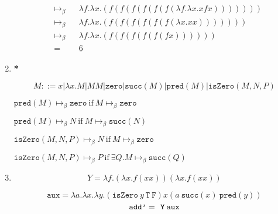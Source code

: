 \documentclass[11pt]{article}
\begin{document}
\begin{enumerate}
\begin{enumerate}
\begin{align*}
			            \mapsto_\beta                                  &  & \lambda f. \lambda x. (f(f(f(f(f(f( \lambda f. \lambda x. x f x)))))))                                                           & \\
			            \mapsto_\beta                                  &  & \lambda f. \lambda x. (f(f(f(f(f(f( \lambda x. x x )))))))                                                                       & \\
			            \mapsto_\beta                                  &  & \lambda f. \lambda x. (f(f(f(f(f(f x))))))                                                                                       & \\
			            =                                              &  & \underline{6}                                                                                                                    &
		            \end{align*}
	      \end{enumerate}
	      \newpage
	\item \textbf{*}

	      $$
		      M ::= x | \lambda x.M | M M | \texttt{zero} | \texttt{succ}(M) | \texttt{pred}( M ) | \texttt{isZero}( M,N,P )
	      $$

	      $ \texttt{pred}(M) \mapsto_\beta \texttt{zero} \: \text{if} \: M \mapsto_\beta \texttt{zero} $

	      $ \texttt{pred}(M) \mapsto_\beta N \: \text{if} \: M \mapsto_\beta \texttt{succ}(N) $

	      $ \texttt{isZero}(M,N,P) \mapsto_\beta N \: \text{if} \: M \mapsto_\beta \texttt{zero} $

	      $ \texttt{isZero}(M,N,P) \mapsto_\beta P \: \text{if} \: \exists Q . M \mapsto_\beta \texttt{succ}(Q) $


	      \newpage
	\item

	      $$
		      Y = \lambda f.( \lambda x. f(xx))( \lambda x.f(xx))
	      $$

	      $$
		      \texttt{aux} = \lambda a. \lambda x. \lambda y. ( \texttt{isZero} \: y \: \texttt{T} \: \texttt{F}) x ( a \: \texttt{succ}(x) \: \texttt{pred}(y))
	      $$
	      $$
		      \texttt{add'} = \textbf{ \texttt{Y}} \: \texttt{aux}
	      $$


\end{enumerate}
\end{document}

